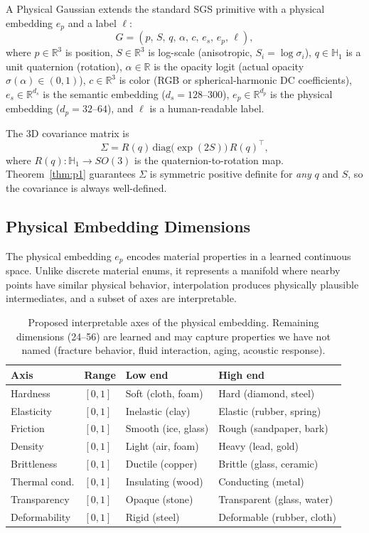 \documentclass[twoside,11pt]{article}
\begin{document}
A Physical Gaussian extends the standard SGS primitive with a physical embedding $e_p$ and a label $\ell$:
\begin{equation}
G = (p,\, S,\, q,\, \alpha,\, c,\, e_s,\, e_p,\, \ell),
\end{equation}
where $p \in \mathbb{R}^3$ is position, $S \in \mathbb{R}^3$ is log-scale (anisotropic, $S_i = \log \sigma_i$), $q \in \mathbb{H}_1$ is a unit quaternion (rotation), $\alpha \in \mathbb{R}$ is the opacity logit (actual opacity $\sigma(\alpha) \in (0,1)$), $c \in \mathbb{R}^3$ is color (RGB or spherical-harmonic DC coefficients), $e_s \in \mathbb{R}^{d_s}$ is the semantic embedding ($d_s = 128\text{--}300$), $e_p \in \mathbb{R}^{d_p}$ is the physical embedding ($d_p = 32\text{--}64$), and $\ell$ is a human-readable label.

The 3D covariance matrix is
\begin{equation}
\label{eq:covariance}
\Sigma = R(q)\,\mathrm{diag}\!\big(\exp(2S)\big)\,R(q)^{\top},
\end{equation}
where $R(q): \mathbb{H}_1 \to SO(3)$ is the quaternion-to-rotation map. Theorem~\ref{thm:p1} guarantees $\Sigma$ is symmetric positive definite for \emph{any} $q$ and $S$, so the covariance is always well-defined.

\subsection{Physical Embedding Dimensions}

The physical embedding $e_p$ encodes material properties in a learned continuous space. Unlike discrete material enums, it represents a manifold where nearby points have similar physical behavior, interpolation produces physically plausible intermediates, and a subset of axes are interpretable.

\begin{table}[t]
\centering
\caption{Proposed interpretable axes of the physical embedding. Remaining
dimensions (24--56) are learned and may capture properties we have not named
(fracture behavior, fluid interaction, aging, acoustic response).}
\label{tab:axes}
\begin{tabular}{llll}
\toprule
Axis & Range & Low end & High end \\
\midrule
Hardness & $[0,1]$ & Soft (cloth, foam) & Hard (diamond, steel) \\
Elasticity & $[0,1]$ & Inelastic (clay) & Elastic (rubber, spring) \\
Friction & $[0,1]$ & Smooth (ice, glass) & Rough (sandpaper, bark) \\
Density & $[0,1]$ & Light (air, foam) & Heavy (lead, gold) \\
Brittleness & $[0,1]$ & Ductile (copper) & Brittle (glass, ceramic) \\
Thermal cond. & $[0,1]$ & Insulating (wood) & Conducting (metal) \\
Transparency & $[0,1]$ & Opaque (stone) & Transparent (glass, water) \\
Deformability & $[0,1]$ & Rigid (steel) & Deformable (rubber, cloth) \\
\bottomrule
\end{tabular}
\end{table}
\end{document}
